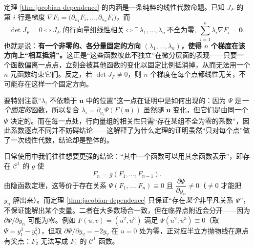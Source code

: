 \begin{remark}
定理 \ref{thm:jacobian-dependence} 的内涵是一条纯粹的线性代数命题。已知 \(J_F\) 的第 \(i\) 行是梯度 \(\nabla F_i=\bigl(\partial_{u_1}F_i,\dots,\partial_{u_n}F_i\bigr)\)，而
\[
\det J_F=0
\iff J_F\text{ 的行向量组线性相关}
\iff \exists\,\lambda_1,\dots,\lambda_n\ \text{不全为零},\ \sum_{i=1}^n\lambda_i\nabla F_i=\mathbf 0 .
\]
也就是说：\textbf{有一个非零的、各分量固定的方向 \((\lambda_1,\dots,\lambda_n)\)，使得 \(n\) 个梯度在该方向上“相互抵消”。}这正是“这些函数彼此不独立”在微分层面的表现——只要一个函数偏离一点点，立刻会被其他函数的变化以固定比例抵消掉，从而无法用一个 \(n\) 元函数约束它们。反之，若 \(\det J_F\ne0\)，则 \(n\) 个梯度在每个点都线性无关，不可能存在这样一个固定方向。

要特别注意“\(\lambda_i\) 不依赖于 \(\mathbf u\) 中的位置”这一点在证明中是如何出现的：因为 \(\Psi\) 是\emph{一个固定的}函数，所以复合 \(\lambda_i=\partial_{y_i}\Psi(F(\mathbf u))\) 虽然随 \(\mathbf u\) 变化，但它们是由同一个 \(\Psi\) 决定的。而在每一点处，行向量组的相关性只需“存在某组不全为零的系数”，因此系数逐点不同并不妨碍结论——这解释了为什么定理的证明虽然“只对每个点”做了一次线性代数，结论却是整体的。
\end{remark}

\begin{remark}[“\(F_n=g(F_1,\dots,F_{n-1})\)”与“函数相关”的区别]
日常使用中我们往往想要更强的结论：“其中一个函数可以用其余函数表示”，即存在 \(\mathcal C^1\) 的 \(g\) 使
\[
F_n=g(F_1,\dots,F_{n-1}).
\]
由隐函数定理，这等价于存在关系 \(\Psi(F_1,\dots,F_n)\equiv0\) 且 \(\dfrac{\partial\Psi}{\partial y_n}\ne0\)（\(\ne0\) 才能把 \(y_n\) 解出来）。而定理 \ref{thm:jacobian-dependence} 只保证“存在\emph{某个}非平凡关系 \(\Psi\)”，不保证能解出某个变量。二者在大多数场合一致，但在临界点附近会分开——因为 \(\partial\Psi/\partial y_n\) 可能为零。例如 \(F(u,v)=(u^2,u^3)\) 满足 \(\Psi(u^2,u^3)\equiv0\)（取 \(\Psi=y_1^3-y_2^2\)），但取 \(\partial\Psi/\partial y_2=-2y_2\) 在 \(u=0\) 处为零，正对应半立方抛物线在原点有尖点：\(F_2\) 无法写成 \(F_1\) 的 \(\mathcal C^1\) 函数。
\end{remark}

